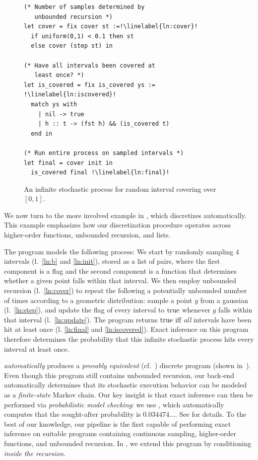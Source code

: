 \begin{figure}[t]
\begin{minipage}[t]{0.48\textwidth}
\begin{lstlisting}
(* Number of samples determined by
   unbounded recursion *)
let cover = fix cover st :=!\linelabel{ln:cover}!
  if uniform(0,1) < 0.1 then st
  else cover (step st) in

(* Have all intervals been covered at
   least once? *)
let is_covered = fix is_covered ys := !\linelabel{ln:iscovered}!
  match ys with
    | nil -> true
    | h :: t -> (fst h) && (is_covered t)
  end in

(* Run entire process on sampled intervals *)
let final = cover init in
  is_covered final !\linelabel{ln:final}!
\end{lstlisting}
\end{minipage}%
\hspace{4pt}

\caption{An infinite stochastic process for random interval covering over $[0,1]$.}
\label{fig:epsball}
\end{figure}
\noindent
We now turn to the more involved example in , which \Slice{} discretizes automatically. This example emphasizes how our discretization procedure operates across higher-order functions, unbounded recursion, and lists.

The program models the following process: We start by randomly sampling $4$ intervals (l.\ \ref{ln:b} and \ref{ln:init}), stored as a list of pairs, where the first component is a flag and the second component is a function that determines whether a given point falls within that interval. We then employ unbounded recursion (l.\ \ref{ln:cover}) to repeat the following a potentially unbounded number of times according to a geometric distribution: sample a point $y$ from a gaussian (l.\ \ref{ln:step}), and update the flag of every interval to $\textnormal{true}$ whenever $y$ falls within that interval (l.\ \ref{ln:update}). The program returns $\textnormal{true}$ iff \emph{all} intervals have been hit at least once (l. \ref{ln:final} and \ref{ln:iscovered}). Exact inference on this program therefore determines the probability that this infinite stochastic process hits every interval at least once.

\Slice{} \emph{automatically} produces a \emph{provably equivalent} (cf.\ ) discrete program (shown in~\cite[\S~A.5]{Wu2026SliceExtended}). Even though this program still contains unbounded recursion, our back-end automatically determines that its stochastic execution behavior can be modeled as a \emph{finite-state} Markov chain. Our key insight is that exact inference can then be performed via \emph{probabilistic model checking}: we use \Storm{} \cite{storm}, which automatically computes that the sought-after probability is $0.034474...$. See  for details. To the best of our knowledge, our pipeline is the first capable of performing exact inference on suitable programs containing continuous sampling, higher-order functions, and unbounded recursion. In , we extend this program by conditioning \emph{inside the recursion}.

